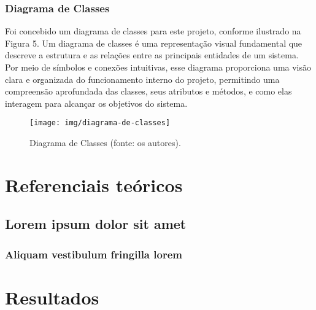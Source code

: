 \documentclass[
	12pt,				%
	openright,			%
	twoside,			%
	a4paper,			%
	english,			%
	brazil				%
	]{abntex2}
\begin{document}
\section{Diagrama de Classes}

Foi concebido um diagrama de classes para este projeto, conforme ilustrado na Figura 5. Um diagrama de classes é uma representação visual fundamental que descreve a estrutura e as relações entre as principais entidades de um sistema. Por meio de símbolos e conexões intuitivas, esse diagrama proporciona uma visão clara e organizada do funcionamento interno do projeto, permitindo uma compreensão aprofundada das classes, seus atributos e métodos, e como elas interagem para alcançar os objetivos do sistema.

\begin{figure}[htb]
	\centering
	\texttt{[image: img/diagrama-de-classes]}
	\caption{Diagrama de Classes (fonte: os autores).}
	\label{fig:diagrama-de-classes}
\end{figure}

\part{Referenciais teóricos}

\chapter{Lorem ipsum dolor sit amet}

\section{Aliquam vestibulum fringilla lorem}

\lipsum[1]

\lipsum[2-3]

\part{Resultados}

\end{document}
